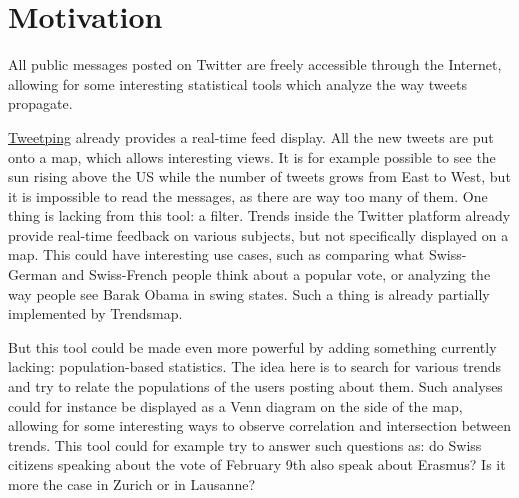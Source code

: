 \section{Motivation}
All public messages posted on Twitter are freely accessible through the Internet, allowing for some interesting statistical tools which analyze the way tweets propagate.

\href{http://www.tweetping.net}{Tweetping} already provides a real-time feed display. All the new tweets are put onto a map, which allows interesting views. It is for example possible to see the sun rising above the US while the number of tweets grows from East to West, but it is impossible to read the messages, as there are way too many of them. One thing is lacking from this tool: a filter. Trends inside the Twitter platform already provide real-time feedback on various subjects, but not specifically displayed on a map. This could have interesting use cases, such as comparing what Swiss-German and Swiss-French people think about a popular vote, or analyzing the way people see Barak Obama in swing states. Such a thing is already partially implemented by Trendsmap.

But this tool could be made even more powerful by adding something currently lacking: population-based statistics. The idea here is to search for various trends and try to relate the populations of the users posting about them. Such analyses could for instance be displayed as a Venn diagram on the side of the map, allowing for some interesting ways to observe correlation and intersection between trends. This tool could for example try to answer such questions as: do Swiss citizens speaking about the vote of February 9th also speak about Erasmus? Is it more the case in Zurich or in Lausanne?
